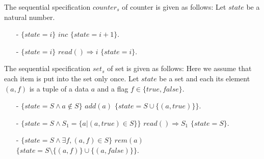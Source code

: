 \begin{example}[Counter]
\label{definition:sequential specification of counter}
The sequential specification $\mathit{counter}_s$ of counter is given as follows: Let $\mathit{state}$ be a natural number.

\begin{itemize}
\setlength{\itemsep}{0.5pt}
\item[-] $\{ \mathit{state} = i \}$ $\mathit{inc}$ $\{ \mathit{state} = i+1 \}$.
\item[-] $\{ \mathit{state} = i \}$ $\mathit{read}() \Rightarrow i$ $\{ \mathit{state} = i \}$.
\end{itemize}
\end{example}


\begin{example}[Set]
\label{definition:sequential specification of set}
The sequential specification $\mathit{set}_s$ of set is given as follows: Here we assume that each item is put into the set only once. Let $\mathit{state}$ be a set and each its element $(a,f)$ is a tuple of a data $a$ and a flag $f \in \{ \mathit{true},\mathit{false} \}$.

\begin{itemize}
\setlength{\itemsep}{0.5pt}
\item[-] $\{ \mathit{state} = S \wedge a \notin S \}$ $\mathit{add}(a)$ $\{ \mathit{state} = S \cup \{ (a,\mathit{true}) \} \}$.
\item[-] $\{ \mathit{state} = S \wedge S_1 = \{a \vert (a,\mathit{true}) \in S \} \}$ $\mathit{read}() \Rightarrow S_1$ $\{ \mathit{state} = S \}$.
\item[-] $\{ \mathit{state} = S \wedge \exists f, (a,f) \in S \}$ $\mathit{rem}(a)$ $\{ \mathit{state} = S \setminus \{ (a,f) \} \cup \{ (a,\mathit{false}) \} \}$.
\end{itemize}
\end{example}



